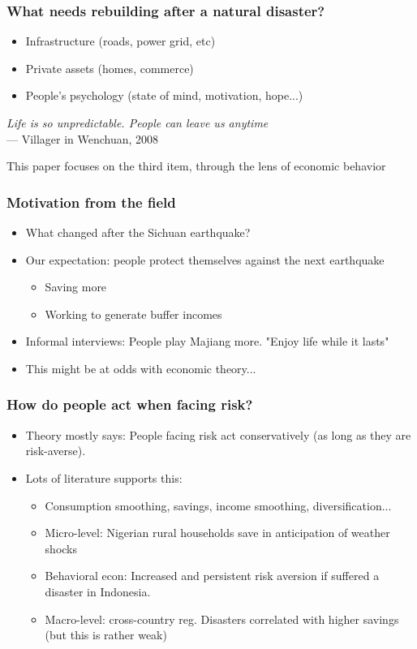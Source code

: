 \documentclass[aspectratio=169]{beamer}
\begin{document}
\begin{frame}[label=top]
    \frametitle{\Large{What needs rebuilding after a natural disaster?}}
    \begin{itemize}
		\item Infrastructure (roads, power grid, etc) 
		\item Private assets (homes, commerce) 
		\item People's psychology (state of mind, motivation, hope...)  
	\end{itemize}  
	\vspace{0.5cm}
	\pause
    \begin{tcolorbox}{}
    \textit{Life is so unpredictable. People can leave us anytime}\\ --- Villager in Wenchuan, 2008
    \end{tcolorbox} 
    \vspace{0.5cm}
	\pause
	This paper focuses on the third item, through the lens of economic  behavior 
\end{frame}  


\begin{frame}
    \frametitle{\LARGE{Motivation from the field}}
    \begin{itemize}
		\item What changed after the Sichuan earthquake? 
		\item Our expectation: people protect themselves against the next earthquake
		\begin{itemize}
		    \item Saving more
		    \item Working to generate buffer incomes
		\end{itemize}
		\item <2-> Informal interviews: 
		    People play Majiang more. "Enjoy life while it lasts"
		\item <2-> This might be at odds with economic theory... 
	\end{itemize}  
\end{frame}  

\begin{frame}
    \frametitle{\LARGE{How do people act when facing risk?}}
	\begin{itemize}
		\item Theory mostly says: People facing risk act conservatively (as long as they are risk-averse).
		\item Lots of literature supports this: 
		\begin{itemize}
		    \item Consumption smoothing, savings, income smoothing, diversification...
		    \item Micro-level: \cite{Udry1995}  Nigerian rural households save in anticipation of weather shocks
		    \item Behavioral econ: \cite{Cameron2013} Increased and persistent risk aversion if suffered a disaster in Indonesia. 
		    \item Macro-level: \cite{Skidmore2001} cross-country reg. Disasters correlated with higher savings (but this is rather weak)
		\end{itemize}
	\end{itemize}
\end{frame} 
\end{document}
